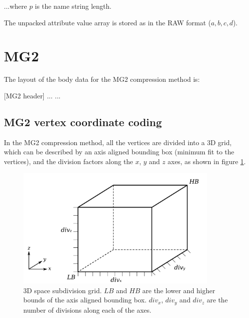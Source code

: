 ...where $p$ is the name string length.

The unpacked attribute value array is stored as in the RAW format ($a, b, c, d$).


\section{MG2}
The layout of the body data for the MG2 compression method is:

[MG2 header]\newline
[Vertices]\newline
[Indices]\newline
[Normals]\newline
[UV map 0]\newline
[UV map 1]\newline
...\newline
[UV map N]\newline
...

\subsection{MG2 vertex coordinate coding}
\label{sec:MG2VertexCoding}
In the MG2 compression method, all the vertices are divided into a 3D grid,
which can be described by an axis aligned bounding box (minimum fit to the
vertices), and the division factors along the $x$, $y$ and $z$ axes, as shown
in figure \ref{fig:Grid}.

\begin{figure}[pht]
\centering
\includegraphics[width=10.0cm]{grid.pdf}
\caption{3D space subdivision grid. $LB$ and $HB$ are the lower and higher bounds
of the axis aligned bounding box. $div_x$, $div_y$ and $div_z$ are the number
of divisions along each of the axes.}
\label{fig:Grid}
\end{figure}

